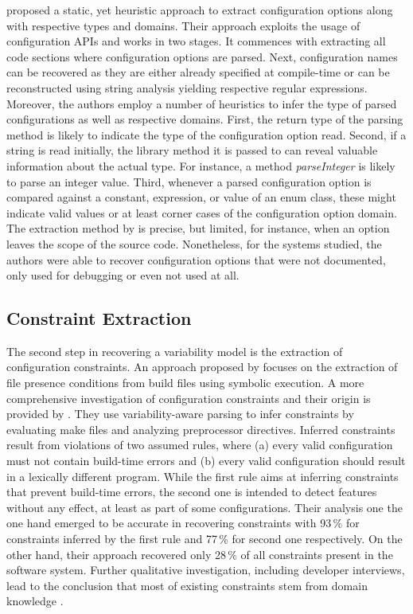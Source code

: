 \cite{rabkin_static_2011} proposed a static, yet heuristic approach to extract
configuration options along with respective types and domains. Their approach
exploits the usage of configuration APIs and works
in two stages. It commences with extracting all code sections where
configuration options are parsed. Next, configuration names can be
recovered as they are either already specified at compile-time or can be
reconstructed using string analysis yielding respective regular expressions.
Moreover, the authors employ a number of heuristics to infer the type of parsed
configurations as well as respective domains. First, the return type of the
parsing method is likely to indicate the type of the configuration option read.
Second, if a string is read initially, the library method it is passed to can
reveal valuable information about the actual type. For instance, a method
\emph{parseInteger} is likely to parse an integer value. Third, whenever a
parsed configuration option is compared against a constant, expression, or value
of an enum class, these might indicate valid values or at least corner cases of
the configuration option domain. The extraction method by
\cite{rabkin_static_2011} is precise, but limited, for instance, when an
option leaves the scope of the source code.
Nonetheless, for the systems studied, the authors were able to recover
configuration options that were not documented, only used for debugging or even not used at
all.

\subsection{Constraint Extraction}
The second step in recovering a variability model is the
extraction of configuration constraints. An approach proposed by \cite{zhou_extracting_2015}
focuses on the extraction of file presence conditions from build files using symbolic execution. A more comprehensive investigation of configuration
constraints and their origin is provided by \cite{nadi_mining_2014,nadi_where_2015}. They
use variability-aware parsing to infer constraints by
evaluating make files and  analyzing preprocessor directives. Inferred
constraints result from violations of two assumed rules, where (a) every valid
configuration must not contain build-time errors and (b) every valid
configuration should result in a lexically different program. While the
first rule aims at inferring constraints that prevent build-time errors, the
second one is intended to detect features without any effect, at least as part
of some configurations. Their analysis one the one hand emerged to be accurate
in recovering constraints with 93\,\% for constraints inferred by the first rule
and 77\,\% for second one respectively. On the other hand, their approach
recovered only 28\,\% of all constraints present in the software system.
Further qualitative investigation, including developer interviews, lead to
the conclusion that most of existing constraints stem from domain knowledge
\citep{nadi_where_2015}.

